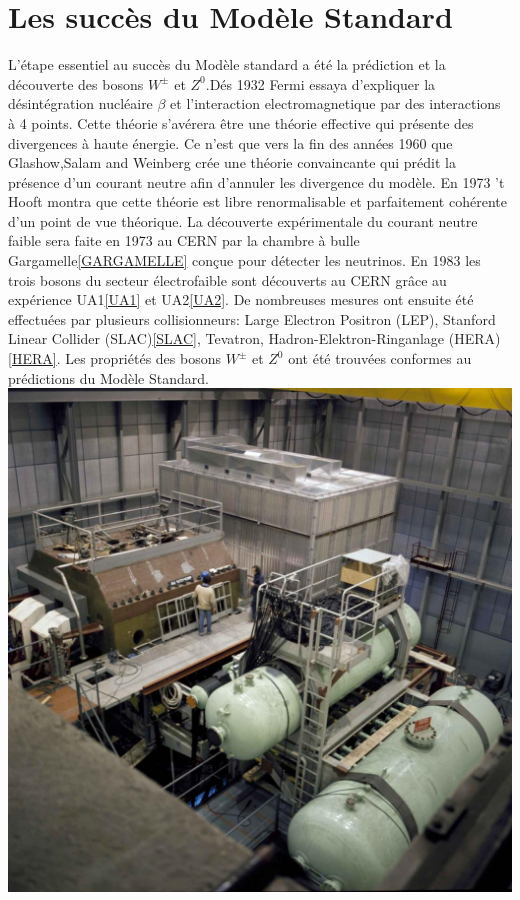 \section{Les succès du Modèle Standard}
L'étape essentiel au succès du Modèle standard a été la prédiction et la découverte des bosons $W^{\pm}$ et $Z^{0}$.Dés 1932 Fermi essaya d'expliquer la désintégration nucléaire $\beta$ et l'interaction electromagnetique par des interactions à 4 points. Cette théorie  s'avérera être une théorie effective qui présente des divergences à haute énergie. Ce n'est que vers la fin des années 1960 que Glashow,Salam and Weinberg crée une théorie convaincante qui prédit la présence d'un courant neutre afin d'annuler les divergence du modèle. En 1973 't Hooft montra que cette théorie est libre renormalisable et parfaitement cohérente d'un point de vue théorique. La découverte expérimentale du courant neutre faible sera faite en 1973 au CERN par la chambre à bulle Gargamelle\ref{GARGAMELLE} conçue pour détecter les neutrinos. En 1983 les trois bosons du secteur électrofaible sont découverts au CERN grâce au expérience UA1\ref{UA1} et UA2\ref{UA2}. De nombreuses mesures ont ensuite été effectuées par plusieurs collisionneurs: Large Electron Positron (LEP), Stanford Linear Collider (SLAC)\ref{SLAC}, Tevatron, Hadron-Elektron-Ringanlage (HERA)\ref{HERA}. Les propriétés des bosons $W^{\pm}$ et $Z^{0}$ ont été trouvées conformes au prédictions du Modèle Standard. 
\marginpar
{
	\centering
	\includegraphics[width=\marginparwidth]{SM/gargamelle.jpg}
	\label{GARGAMELLE}
}
